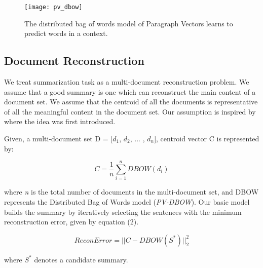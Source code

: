 \documentclass[11pt,a4paper]{article}
\begin{document}
\begin{figure}[h!]
\texttt{[image: pv\_dbow]}
\caption{The distributed bag of words model of Paragraph Vectors learns to predict words in a context.}
\end{figure}

\subsection{Document Reconstruction}

We treat summarization task as a multi-document reconstruction problem. We assume that a good summary is one which can reconstruct the main content of a document set. We assume that the centroid of all the documents is representative of all the meaningful content in the document set. Our assumption is inspired by \cite{centroid} where the idea was first introduced. 


Given, a multi-document set D = [$d_1$, $d_2$, ... , $d_n$], centroid vector C is represented by:



\begin{equation}
 C = \frac{1}{n} \sum_{i=1}^{n}  DBOW(d_i) 
\end{equation}

where \textit{n} is the total number of documents in the multi-document set, and DBOW represents the Distributed Bag of Words model (\textit{PV-DBOW}). Our basic model builds the summary by iteratively selecting the sentences with the minimum reconstruction error, given by equation (2).

\begin{equation}
 ReconError = || C - \textit{DBOW}(S^*) ||_2^2
\end{equation}

where $S^*$ denotes a candidate summary. 
\end{document}
